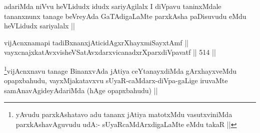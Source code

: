 \begin{artha}
adariMda niVvu heVLidudx idudx sariyAgilalx I diVpavu taninxMdale tananxnunx tanage beVreyAda GaTAdigaLaMte parxkAsha paDisuvudu eMdu heVLidudx sariyalalx ||
\end{artha}


\begin{shl}
vijAcnxnamapi tadiBxnanxjAticidAgxrXhayxmiSayxtAmf || \\
vayxcnajxkatAvxvisheVSatAvxdarxvicanadxrXparxdiVpavatf ||  514 ||  
\end{shl}

\begin{artha}
\footnote{yAvudu parxkAshatavo adu tananx jAtiya matotxMdu vasutxviniMda parxkAshavAguvudu udA:- sUyaRcaMdArxdigaLaMte eMdu takaR ||}vijAcnxnavu tanage BinanxvAda jAtiya ceYtanayxdiMda gArxhayxveMdu opapxbahudu, vayxMjakatavxvu sUyaR-caMdarx-diVpa-gaLige iruvaMte samAnavAgideyAdariMda (hAge opapxbahudu) ||
\end{artha}
